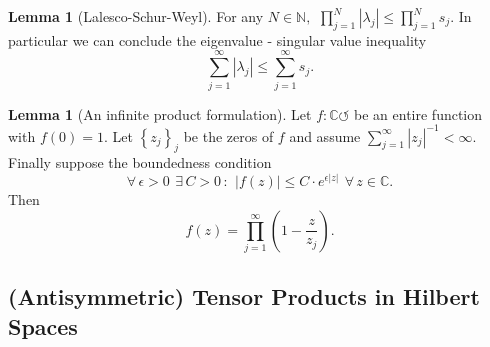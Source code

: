 \documentclass[a4paper]{article}
\newcommand{\bbN}{\mathbb{N}}
\newcommand{\bbC}{\mathbb{C}}
\theoremstyle{definition}
\newtheorem{lemma}[definition]{Lemma}
\theoremstyle{remark}
\theoremstyle{remark}
\begin{document}
\begin{lemma}[Lalesco-Schur-Weyl]
    For any $N \in \bbN,\,\ \prod_{j=1}^N | \lambda_j | \leq \prod_{j=1}^N s_j$. 
    In particular we can conclude the eigenvalue - singular value inequality 
    \begin{equation}
        \sum_{j=1}^{\infty} | \lambda_j | \leq \sum_{j=1}^{\infty} s_j . 
    \end{equation}
\end{lemma}

\begin{lemma}[An infinite product formulation]
    \label{prod}
    Let $f : \bbC \circlearrowleft$ be an entire function with $f(0) = 1$. Let $\left\{ z_j \right\}_j$ be the zeros of $f$ and assume $\sum_{j=1}^{\infty} | z_j |^{-1} < \infty$. Finally suppose the boundedness condition
    \begin{equation}
        \forall\, \epsilon > 0\,\  \exists\, C > 0 \,:\,\ | f(z) | \leq C \cdot e^{\epsilon |z|}\,\ \forall\, z \in \bbC . 
    \end{equation}
    Then 
    \begin{equation}
        f(z) = \prod_{j=1}^{\infty} (1 - \frac{z}{z_j}) . 
    \end{equation}
\end{lemma}

\subsection{(Antisymmetric) Tensor Products in Hilbert Spaces}
\end{document}
